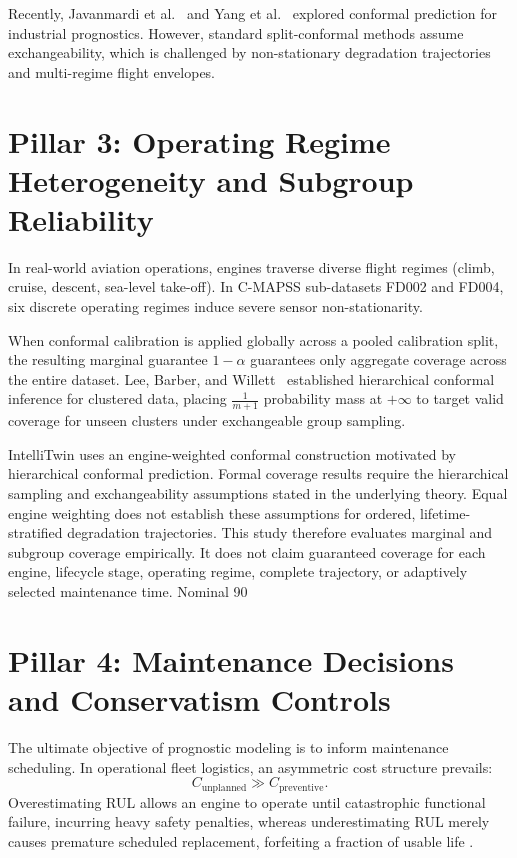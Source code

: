 Recently, Javanmardi et al.~\cite{javanmardi2023conformal} and Yang et al.~\cite{yang2026empirical} explored conformal prediction for industrial prognostics. However, standard split-conformal methods assume exchangeability, which is challenged by non-stationary degradation trajectories and multi-regime flight envelopes.

\section{Pillar 3: Operating Regime Heterogeneity and Subgroup Reliability}
In real-world aviation operations, engines traverse diverse flight regimes (climb, cruise, descent, sea-level take-off). In C-MAPSS sub-datasets FD002 and FD004, six discrete operating regimes induce severe sensor non-stationarity.

When conformal calibration is applied globally across a pooled calibration split, the resulting marginal guarantee $1-\alpha$ guarantees only aggregate coverage across the entire dataset. Lee, Barber, and Willett~\cite{lee2023hierarchical} established hierarchical conformal inference for clustered data, placing $\frac{1}{m+1}$ probability mass at $+\infty$ to target valid coverage for unseen clusters under exchangeable group sampling.

IntelliTwin uses an engine-weighted conformal construction motivated by hierarchical conformal prediction. Formal coverage results require the hierarchical sampling and exchangeability assumptions stated in the underlying theory. Equal engine weighting does not establish these assumptions for ordered, lifetime-stratified degradation trajectories. This study therefore evaluates marginal and subgroup coverage empirically. It does not claim guaranteed coverage for each engine, lifecycle stage, operating regime, complete trajectory, or adaptively selected maintenance time. Nominal 90%

\section{Pillar 4: Maintenance Decisions and Conservatism Controls}
The ultimate objective of prognostic modeling is to inform maintenance scheduling. In operational fleet logistics, an asymmetric cost structure prevails:
\begin{equation}
C_{\text{unplanned}} \gg C_{\text{preventive}}.
\end{equation}
Overestimating RUL allows an engine to operate until catastrophic functional failure, incurring heavy safety penalties, whereas underestimating RUL merely causes premature scheduled replacement, forfeiting a fraction of usable life \cite{saxena2008damage, robinson2026riskaware}.

